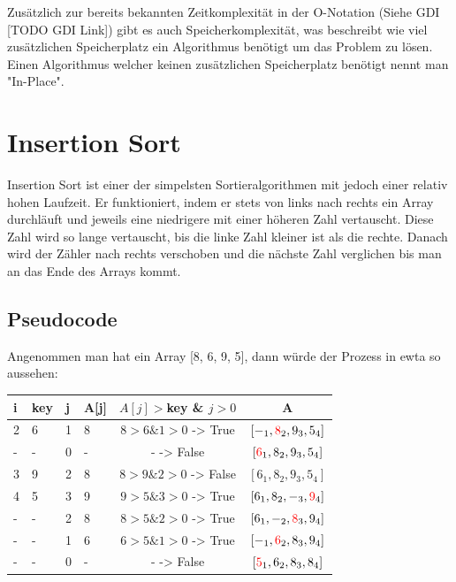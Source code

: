 \documentclass{article}
\begin{document}
	Zusätzlich zur bereits bekannten Zeitkomplexität in der O-Notation (Siehe GDI [TODO GDI Link]) gibt es auch Speicherkomplexität, was beschreibt wie viel zusätzlichen Speicherplatz ein Algorithmus benötigt um das Problem zu lösen. Einen Algorithmus welcher keinen zusätzlichen Speicherplatz benötigt nennt man "In-Place". \\
	\section{Insertion Sort}
	Insertion Sort ist einer der simpelsten Sortieralgorithmen mit jedoch einer relativ hohen Laufzeit. Er funktioniert, indem er stets von links nach rechts ein Array durchläuft und jeweils eine niedrigere mit einer höheren Zahl vertauscht. Diese Zahl wird so lange vertauscht, bis die linke Zahl kleiner ist als die rechte. Danach wird der Zähler nach rechts verschoben und die nächste Zahl verglichen bis man an das Ende des Arrays kommt. \\
	\subsection{Pseudocode}
	Angenommen man hat ein Array [8, 6, 9, 5], dann würde der Prozess in ewta so aussehen: \\
	\begin{tabular}{| l | l | l | l | c | c |}
		\toprule
		i & key & j & A[j] & $A[j]>$key \& $j>0$ & A \\ \midrule
		2 & 6 & 1 & 8 & $8>6\&1>0$ -> True & $[-_1, \textcolor{red}{8}_2, 9_3, 5_4]$ \\
		- & - & 0 & - & - -> False & $[\textcolor{red}{6}_1, 8_2, 9_3, 5_4]$ \\ \hline
		3 & 9 & 2 & 8 & $8>9\&2>0$ -> False & $[6_1, 8_2, 9_3, 5_4]$ \\ \hline
		4 & 5 & 3 & 9 & $9>5\&3>0$ -> True & $[6_1, 8_2, -_3, \textcolor{red}{9}_4]$ \\
		- & - & 2 & 8 & $8>5\&2>0$ -> True & $[6_1, -_2, \textcolor{red}{8}_3, 9_4]$ \\
		- & - & 1 & 6 & $6>5\&1>0$ -> True & $[-_1, \textcolor{red}{6}_2, 8_3, 9_4]$ \\
		- & - & 0 & - & - -> False & $[\textcolor{red}{5}_1, 6_2, 8_3, 8_4]$ \\
		\bottomrule
	\end{tabular}
\end{document}
